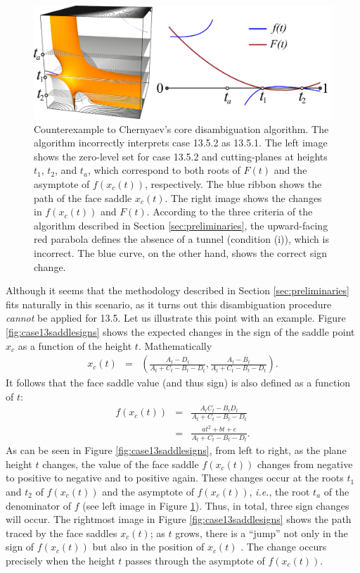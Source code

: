 \begin{figure}[t]
     \centering
     \includegraphics[width=0.7\linewidth]{chapter4/figures//graph.png}
     \caption{Counterexample to Chernyaev's core disambiguation algorithm. The \mc{} algorithm incorrectly interprets case 13.5.2 as 13.5.1. The left image shows the zero-level set for case 13.5.2 and cutting-planes at heights $t_1$, $t_2$, and $t_a$, which correspond to both roots of $F(t)$ and the asymptote of $f(x_c(t))$, respectively. The blue ribbon shows the path of the face saddle $x_c(t)$. The right image shows the changes in $f(x_c(t))$ and $F(t)$. According to the three criteria of the \mc{} algorithm described in Section \ref{sec:preliminaries},  the upward-facing red parabola defines the absence of a tunnel (condition (i)), which is incorrect. The blue curve, on the other hand, shows the correct sign change.}
     \label{fig:case13counter_example}
\end{figure}

Although it seems that the \mc{} methodology described in Section \ref{sec:preliminaries} fits naturally in this scenario, as it turns out this disambiguation procedure \emph{cannot} be applied for 13.5. 
%
Let us illustrate this point with an example. Figure \ref{fig:case13saddlesigns} shows the expected changes in the sign of the saddle point $x_c$ as a function of the height $t$. Mathematically
\begin{eqnarray}
x_c(t) & = & \left( \frac{A_t - D_t}{A_t+C_t-B_t-D_t}, \frac{A_t - B_t}{A_t+C_t-B_t-D_t} \right).
\end{eqnarray}
It follows that the face saddle value (and thus sign) is also defined as a function of $t$:
\begin{eqnarray}
f(x_c(t)) &=& \frac{A_tC_t - B_tD_t}{A_t+C_t-B_t-D_t}\\
       &=& \frac{a t^2 + b t + c}{A_t+C_t-B_t-D_t}.
\end{eqnarray}
As can be seen in Figure \ref{fig:case13saddlesigns}, from left to right, as the plane height $t$ changes, the value of the face saddle $f(x_c(t))$ changes from negative to positive to negative and to positive again. These changes occur at the roots $t_1$ and $t_2$ of $f(x_c(t))$ and the asymptote of $f(x_c(t))$, {\em i.e.}, the root $t_{a}$ of the denominator of $f$ (see left image in Figure \ref{fig:case13counter_example}). Thus, in total, three sign changes will occur. The rightmost image in Figure \ref{fig:case13saddlesigns} shows the path traced by the face saddles $x_c(t)$; as $t$ grows, there is a ``jump'' not only in the sign of $f(x_c(t))$ but also in the position of $x_c(t)$ . The change occurs precisely when the height $t$ passes through the asymptote of $f(x_c(t))$.

